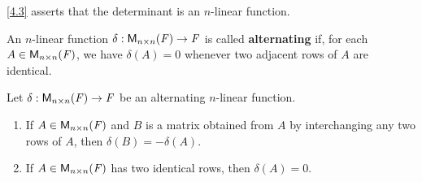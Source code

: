 \begin{note}
	\cref{4.3} asserts that the determinant is an \(n\)-linear function.
\end{note}

\begin{defn}\label{4.5.5}
	An \(n\)-linear function \(\delta : \ms[n][n][\F] \to \F\) is called \textbf{alternating} if, for each \(A \in \ms[n][n][\F]\), we have \(\delta(A) = 0\) whenever two adjacent rows of \(A\) are identical.
\end{defn}

\begin{thm}\label{4.10}
	Let \(\delta : \ms[n][n][\F] \to \F\) be an alternating \(n\)-linear function.
	\begin{enumerate}
		\item If \(A \in \ms[n][n][\F]\) and \(B\) is a matrix obtained from \(A\) by interchanging any two rows of \(A\), then \(\delta(B) = -\delta(A)\).
		\item If \(A \in \ms[n][n][\F]\) has two identical rows, then \(\delta(A) = 0\).
	\end{enumerate}
\end{thm}

